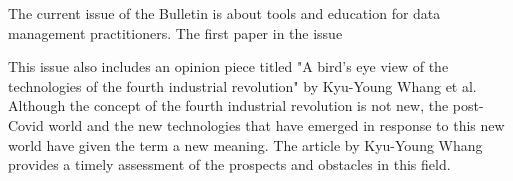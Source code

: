 \documentclass[11pt]{article}
\begin{document}
The current issue of the Bulletin is about tools and education for
data management practitioners. The first paper in the issue

This issue also includes an opinion piece titled "A bird's eye view of
the technologies of the fourth industrial revolution" by Kyu-Young
Whang et al. Although the concept of the fourth industrial revolution
is not new, the post-Covid world and the new technologies that have
emerged in response to this new world have given the term a new
meaning. The article by Kyu-Young Whang provides a timely assessment
of the prospects and obstacles in this field.
\end{document}
